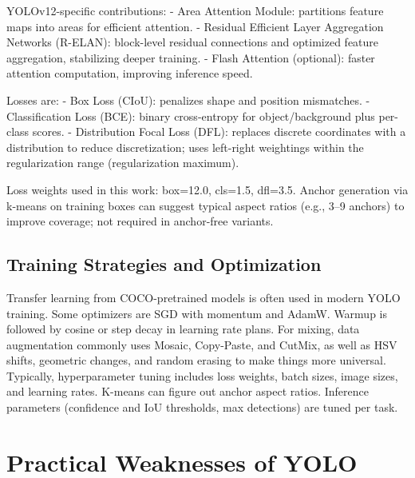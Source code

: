 \documentclass[conference]{IEEEtran}
\begin{document}
YOLOv12-specific contributions:
- Area Attention Module: partitions feature maps into areas for efficient attention.
- Residual Efficient Layer Aggregation Networks (R-ELAN): block-level residual connections and optimized feature aggregation, stabilizing deeper training.
- Flash Attention (optional): faster attention computation, improving inference speed.

Losses are:
- Box Loss (CIoU): penalizes shape and position mismatches.
- Classification Loss (BCE): binary cross-entropy for object/background plus per-class scores.
- Distribution Focal Loss (DFL): replaces discrete coordinates with a distribution to reduce discretization; uses left-right weightings within the regularization range (regularization maximum).

Loss weights used in this work: box=12.0, cls=1.5, dfl=3.5. Anchor generation via k-means on training boxes can suggest typical aspect ratios (e.g., 3--9 anchors) to improve coverage; not required in anchor-free variants.

\subsection{Training Strategies and Optimization}

Transfer learning from COCO-pretrained models is often used in modern YOLO training. Some optimizers are SGD with momentum and AdamW. Warmup is followed by cosine or step decay in learning rate plans. For mixing, data augmentation commonly uses Mosaic, Copy-Paste, and CutMix, as well as HSV shifts, geometric changes, and random erasing to make things more universal. Typically, hyperparameter tuning includes loss weights, batch sizes, image sizes, and learning rates. K-means can figure out anchor aspect ratios. Inference parameters (confidence and IoU thresholds, max detections) are tuned per task.

\section{Practical Weaknesses of YOLO}
\end{document}

